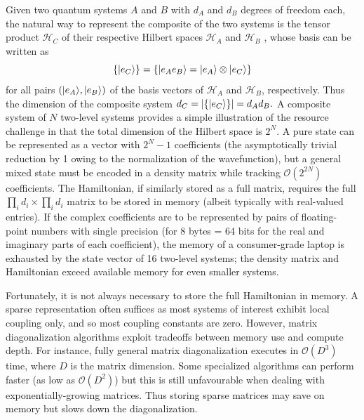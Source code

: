 	Given two quantum systems $A$ and $B$ with $d_A$ and $d_B$ degrees of freedom each, the natural way to represent the composite of the two systems is the tensor product $\mathcal{H}_C$ of their respective Hilbert spaces $\mathcal{H}_A$ and $\mathcal{H}_B$ \cite{Carcassi21}, whose basis can be written as
	\begin{equation}
	\{|e_C\rangle\} = \{|e_A e_B\rangle=|e_A\rangle\otimes|e_C\rangle\}
	\end{equation}
	for all pairs $(|e_A\rangle,|e_B\rangle)$ of the basis vectors of $\mathcal{H}_A$ and $\mathcal{H}_B$, respectively.
	Thus the dimension of the composite system $d_C = |\{|e_C\rangle\}| = d_A d_B.$ A composite system of $N$ two-level systems provides a simple illustration of the resource challenge in that the total dimension of the Hilbert space is $2^N$.
	A pure state can be represented as a vector with $2^N-1$ coefficients (the asymptotically trivial reduction by 1 owing to the normalization of the wavefunction), but a general mixed state must be encoded in a density matrix while tracking $\mathcal{O}(2^{2N})$  coefficients.
	The Hamiltonian, if similarly stored as a full matrix, requires the full $\prod_i d_i\times\prod_i d_i$ matrix to be stored in memory (albeit typically with real-valued entries).
	If the complex coefficients are to be represented by pairs of floating-point numbers with single precision (for 8 bytes = 64 bits for the real and imaginary parts of each coefficient), the memory of a consumer-grade laptop is exhausted by the state vector of 16 two-level systems; the density matrix and Hamiltonian exceed available memory for even smaller systems.

	Fortunately, it is not always necessary to store the full Hamiltonian in memory.
	A sparse representation often suffices as most systems of interest exhibit local coupling only, and so most coupling constants are zero.
	However, matrix diagonalization algorithms exploit tradeoffs between memory use and compute depth.
	For instance, fully general matrix diagonalization executes in $\mathcal{O}(D^{3})$ time, where $D$ is the matrix dimension.
	Some specialized algorithms can perform faster (as low as $\mathcal{O}(D^{2})$) but this is still unfavourable when dealing with exponentially-growing matrices.
	Thus storing sparse matrices may save on memory but slows down the diagonalization.

